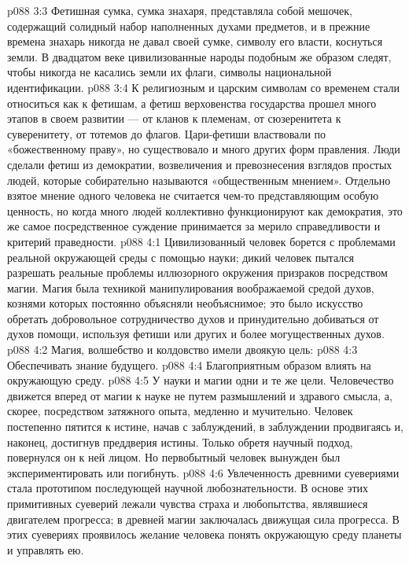 \vs p088 3:3 Фетишная сумка, сумка знахаря, представляла собой мешочек, содержащий солидный набор наполненных духами предметов, и в прежние времена знахарь никогда не давал своей сумке, символу его власти, коснуться земли. В двадцатом веке цивилизованные народы подобным же образом следят, чтобы никогда не касались земли их флаги, символы национальной идентификации.
\vs p088 3:4 К религиозным и царским символам со временем стали относиться как к фетишам, а фетиш верховенства государства прошел много этапов в своем развитии --- от кланов к племенам, от сюзеренитета к суверенитету, от тотемов до флагов. Цари\hyp{}фетиши властвовали по «божественному праву», но существовало и много других форм правления. Люди сделали фетиш из демократии, возвеличения и превознесения взглядов простых людей, которые собирательно называются «общественным мнением». Отдельно взятое мнение одного человека не считается чем\hyp{}то представляющим особую ценность, но когда много людей коллективно функционируют как демократия, это же самое посредственное суждение принимается за мерило справедливости и критерий праведности.
\vs p088 4:1 Цивилизованный человек борется с проблемами реальной окружающей среды с помощью науки; дикий человек пытался разрешать реальные проблемы иллюзорного окружения призраков посредством магии. Магия была техникой манипулирования воображаемой средой духов, кознями которых постоянно объясняли необъяснимое; это было искусство обретать добровольное сотрудничество духов и принудительно добиваться от духов помощи, используя фетиши или других и более могущественных духов.
\vs p088 4:2 Магия, волшебство и колдовство имели двоякую цель:
\vs p088 4:3 \bibnobreakspace Обеспечивать знание будущего.
\vs p088 4:4 \bibnobreakspace Благоприятным образом влиять на окружающую среду.
\vs p088 4:5 \pc У науки и магии одни и те же цели. Человечество движется вперед от магии к науке не путем размышлений и здравого смысла, а, скорее, посредством затяжного опыта, медленно и мучительно. Человек постепенно пятится к истине, начав с заблуждений, в заблуждении продвигаясь и, наконец, достигнув преддверия истины. Только обретя научный подход, повернулся он к ней лицом. Но первобытный человек вынужден был экспериментировать или погибнуть.
\vs p088 4:6 Увлеченность древними суевериями стала прототипом последующей научной любознательности. В основе этих примитивных суеверий лежали чувства страха и любопытства, являвшиеся двигателем прогресса; в древней магии заключалась движущая сила прогресса. В этих суевериях проявилось желание человека понять окружающую среду планеты и управлять ею.
